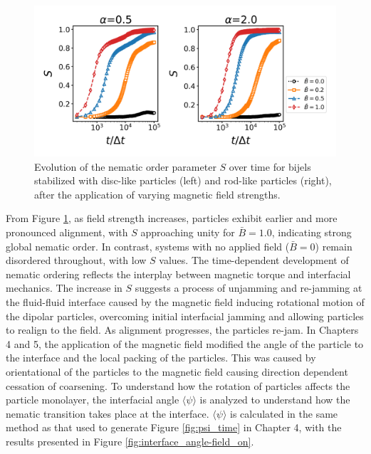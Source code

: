 \begin{figure} 
    \centering 
    \includegraphics[scale=0.4]{../figures/results/paper2/nematic-field_on.png} 
    \caption{Evolution of the nematic order parameter \( S \) over time for bijels stabilized with disc-like particles (left) and rod-like particles (right), 
             after the application of varying magnetic field strengths.} 
    \label{fig:nematic-field_on} 
\end{figure}

From Figure \ref{fig:nematic-field_on}, as field strength increases, particles exhibit earlier and more pronounced alignment, with \( S \) approaching unity 
for \( \bar{B} = 1.0 \), indicating strong global nematic order. In contrast, systems with no applied field (\( \bar{B} = 0 \)) remain disordered throughout, 
with low \( S \) values. The time-dependent development of nematic ordering reflects the interplay between magnetic torque and interfacial mechanics. 
The increase in \( S \) suggests a process of unjamming and re-jamming at the fluid-fluid interface caused by the magnetic field inducing rotational 
motion of the dipolar particles, overcoming initial interfacial jamming and allowing particles to realign to the field. As alignment 
progresses, the particles re-jam. In Chapters 4 and 5, the application of the magnetic field modified the angle of the particle to the interface and the
local packing of the particles. This was caused by orientational of the particles to the magnetic field causing direction dependent cessation of coarsening.
To understand how the rotation of particles affects the particle monolayer, the interfacial angle $\langle \psi \rangle$ is analyzed to understand
how the nematic transition takes place at the interface. $\langle \psi \rangle$ is calculated in the same method as that used to generate Figure \ref{fig:psi_time} 
in Chapter 4, with the results presented in Figure \ref{fig:interface_angle-field_on}. 

